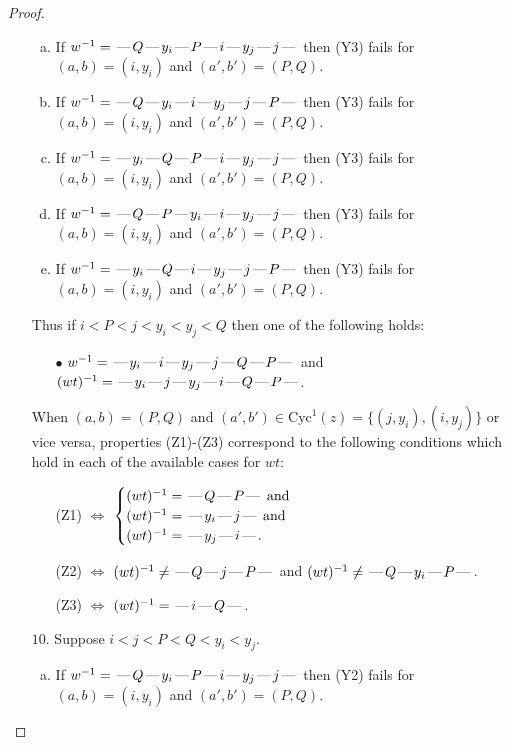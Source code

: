 \documentclass[10pt]{article}
\theoremstyle{definition}
\theoremstyle{definition}
\def\dash{\text{\hspace{0.5mm}---\hspace{0.5mm}}}
\def\Cyc{\mathrm{Cyc}}
\begin{document}
\begin{proof}
\begin{enumerate}
\begin{enumerate}[(a)]
\item If $w^{-1} = \dash Q\dash y_i\dash P\dash i\dash y_j\dash j\dash $ then (Y3) fails for $(a,b)=(i,y_i)$ and $(a',b')=(P,Q)$.
\item If $w^{-1} = \dash Q\dash y_i\dash i\dash y_j\dash j\dash P\dash $ then (Y3) fails for $(a,b)=(i,y_i)$ and $(a',b')=(P,Q)$.
\item If $w^{-1} = \dash y_i\dash Q\dash P\dash i\dash y_j\dash j\dash $ then (Y3) fails for $(a,b)=(i,y_i)$ and $(a',b')=(P,Q)$.
\item If $w^{-1} = \dash Q\dash P\dash y_i\dash i\dash y_j\dash j\dash $ then (Y3) fails for $(a,b)=(i,y_i)$ and $(a',b')=(P,Q)$.
\item If $w^{-1} = \dash y_i\dash Q\dash i\dash y_j\dash j\dash P\dash $ then (Y3) fails for $(a,b)=(i,y_i)$ and $(a',b')=(P,Q)$.
\end{enumerate}
Thus if $i < P < j < y_i < y_j < Q$ then one of the following holds:
\begin{enumerate}
\item[$\bullet$] $w^{-1} = \dash y_i\dash i\dash y_j\dash j\dash Q\dash P\dash $ and $(wt)^{-1} = \dash y_i\dash j\dash y_j\dash i\dash Q\dash P\dash $.
\end{enumerate}
When $(a,b)= (P,Q)$ and $(a',b')\in \Cyc^1(z)=\{(j,y_i),(i,y_j)\}$ or vice versa,
properties (Z1)-(Z3) correspond to the following conditions which
hold in each of the available cases for $wt$:
\begin{enumerate}
\item[](Z1) $\Leftrightarrow$ $\begin{cases}\text{$(wt)^{-1} = \dash Q \dash P \dash$}\text{ and }\\
\text{$(wt)^{-1} = \dash y_i \dash j \dash$}\text{ and }\\
\text{$(wt)^{-1} = \dash y_j \dash i \dash$}.\end{cases}$
\item[](Z2) $\Leftrightarrow$ $(wt)^{-1} \neq \dash Q \dash j \dash P \dash$ and $(wt)^{-1}\neq \dash Q \dash y_i \dash P \dash$.
\item[](Z3) $\Leftrightarrow$ $(wt)^{-1} = \dash i \dash Q \dash$.
\end{enumerate}
\item[$10$.] Suppose $i < j < P < Q < y_i < y_j$.
\begin{enumerate}[(a)]
\item If $w^{-1} = \dash Q\dash y_i\dash P\dash i\dash y_j\dash j\dash $ then (Y2) fails for $(a,b)=(i,y_i)$ and $(a',b')=(P,Q)$.

\end{enumerate}
\end{enumerate}
\end{proof}
\end{document}
